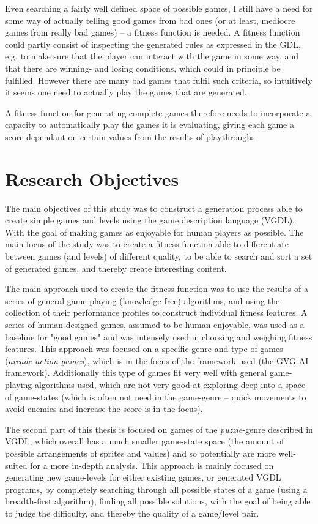 \documentclass[a4paper,titlepage,final]{report}
\begin{document}
Even searching a fairly well defined space of possible games, I still have a need for some way of actually telling good games from bad ones (or at least, mediocre games from really bad games) -- a fitness function is needed. 
A fitness function could partly consist of inspecting the generated rules as expressed in the GDL, e.g. to make sure that the player can interact with the game in some way, and that there are winning- and losing conditions, which could in principle be fulfilled. 
However there are many bad games that fulfil such criteria, so intuitively it seems one need to actually play the games that are generated. 

A fitness function for generating complete games therefore needs to incorporate a capacity to automatically play the games it is evaluating, giving each game a score dependant on certain values from the results of playthroughs.


\section{Research Objectives}
\label{sec_researchobj}
The main objectives of this study was to construct a generation process able to create simple games and levels using the game description language (VGDL). 
With the goal of making games as enjoyable for human players as possible.
The main focus of the study was to create a fitness function able to differentiate between games (and levels) of different quality, to be able to search and sort a set of generated games, and thereby create interesting content.

The main approach used to create the fitness function was to use the results of a series of general game-playing (knowledge free) algorithms, and using the collection of their performance profiles to construct individual fitness features.
A series of human-designed games, assumed to be human-enjoyable, was used as a baseline for "good games" and was intensely used in choosing and weighing fitness features.
This approach was focused on a specific genre and type of games (\textit{arcade-action games}), which is in the focus of the framework used (the GVG-AI framework). 
Additionally this type of games fit very well with general game-playing algorithms used, which are not very good at exploring deep into a space of game-states (which is often not need in the game-genre -- quick movements to avoid enemies and increase the score is in the focus).

The second part of this thesis is focused on games of the \textit{puzzle}-genre described in VGDL, which overall has a much smaller game-state space (the amount of possible arrangements of sprites and values) and so potentially are more well-suited for a more in-depth analysis.
This approach is mainly focused on generating new game-levels for either existing games, or generated VGDL programs, by completely searching through all possible states of a game (using a breadth-first algorithm), finding all possible solutions, with the goal of being able to judge the difficulty, and thereby the quality of a game/level pair.
\end{document}

